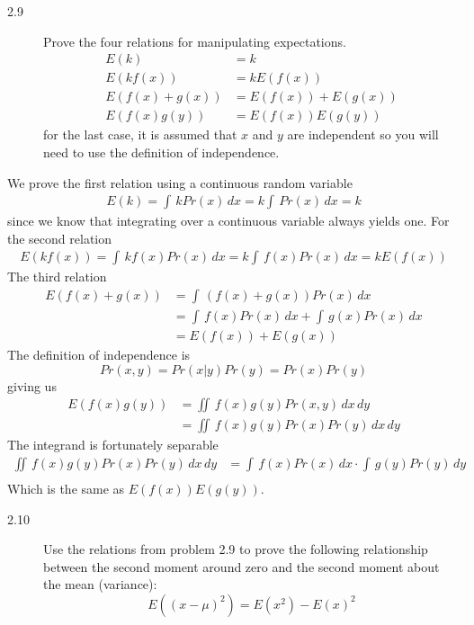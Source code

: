 \documentclass[10pt,a4paper]{article}
\newenvironment{prob}[1]%
   {%
    \begin{description}\item[#1]}%
   {\end{description}}
\begin{document}
\begin{prob}{2.9}
  Prove the four relations for manipulating expectations.
  \begin{align}
    E(k) &= k\\
    E(kf(x)) &= kE(f(x))\\
    E(f(x) + g(x)) &= E(f(x)) + E(g(x))\\
    E(f(x)g(y)) &= E(f(x))E(g(y))
  \end{align}
  for the last case, it is assumed that $x$ and $y$ are independent so
  you will need to use the definition of independence.
\end{prob}
We prove the first relation using a continuous random variable
\begin{align}
  E(k) = \int\,kPr(x)\,dx = k\int\,Pr(x)\,dx=k
\end{align}
since we know that integrating over a continuous variable always
yields one. For the second relation
\begin{align}
  E(kf(x)) = \int\,kf(x)Pr(x)\,dx = k\int\,f(x)Pr(x)\,dx = kE(f(x))
\end{align}
The third relation
\begin{align}
  E(f(x) + g(x)) &= \int\,(f(x) + g(x))Pr(x)\,dx\\
  &= \int\,f(x)Pr(x)\,dx + \int\,g(x)Pr(x)\,dx\\
  &= E(f(x)) + E(g(x))
\end{align}
The definition of independence is
\begin{equation}
  Pr(x, y)=Pr(x|y)Pr(y) = Pr(x)Pr(y)
\end{equation}
giving us
\begin{align}
  E(f(x)g(y)) &= \iint\,f(x)g(y)Pr(x,y)\,dx\,dy \\
  &= \iint\,f(x)g(y)Pr(x)Pr(y)\,dx\,dy
\end{align}
The integrand is fortunately separable
\begin{align}
  \iint\,f(x)g(y)Pr(x)Pr(y)\,dx\,dy &= \int\,f(x)Pr(x)\,dx\cdot\int\,g(y)Pr(y)\,dy\\
\end{align}
Which is the same as $E(f(x))E(g(y))$.
\begin{prob}{2.10}
  Use the relations from problem 2.9 to prove the following
  relationship between the second moment around zero and the second
  moment about the mean (variance):
  \begin{equation}
    E((x - \mu)^2) = E(x^2) - E(x)^2
  \end{equation}
\end{prob}
\end{document}

